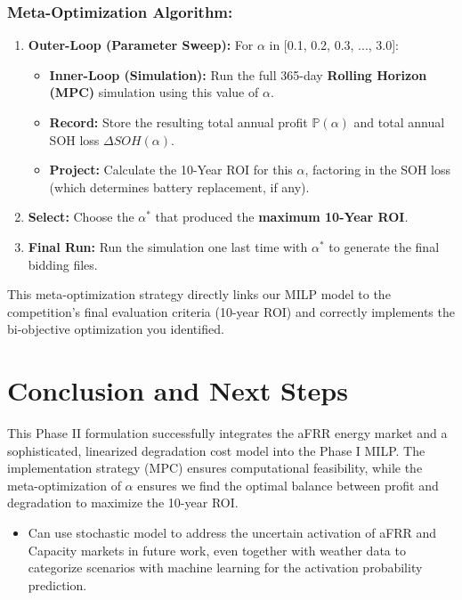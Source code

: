 \documentclass[11pt, a4paper]{article}
\begin{document}
\subsubsection{Meta-Optimization Algorithm:}
\begin{enumerate}
    \item \textbf{Outer-Loop (Parameter Sweep):} For $\alpha$ in [0.1, 0.2, 0.3, ..., 3.0]:
    \begin{itemize}
        \item \textbf{Inner-Loop (Simulation):} Run the full 365-day \textbf{Rolling Horizon (MPC)} simulation using this value of $\alpha$.
        \item \textbf{Record:} Store the resulting total annual profit $\mathbb{P}(\alpha)$ and total annual SOH loss $\Delta SOH(\alpha)$.
        \item \textbf{Project:} Calculate the 10-Year ROI for this $\alpha$, factoring in the SOH loss (which determines battery replacement, if any).
    \end{itemize}
    \item \textbf{Select:} Choose the $\alpha^*$ that produced the \textbf{maximum 10-Year ROI}.
    \item \textbf{Final Run:} Run the simulation one last time with $\alpha^*$ to generate the final bidding files.
\end{enumerate}
This meta-optimization strategy directly links our MILP model to the competition's final evaluation criteria (10-year ROI) and correctly implements the bi-objective optimization you identified.


\section{Conclusion and Next Steps}
This Phase II formulation successfully integrates the aFRR energy market and a sophisticated, linearized degradation cost model into the Phase I MILP. The implementation strategy (MPC) ensures computational feasibility, while the meta-optimization of $\alpha$ ensures we find the optimal balance between profit and degradation to maximize the 10-year ROI.

\begin{itemize}
    \item Can use stochastic model to address the uncertain activation of aFRR and Capacity markets in future work, even together with weather data to categorize scenarios with machine learning for the activation probability prediction.
\end{itemize}
\end{document}
